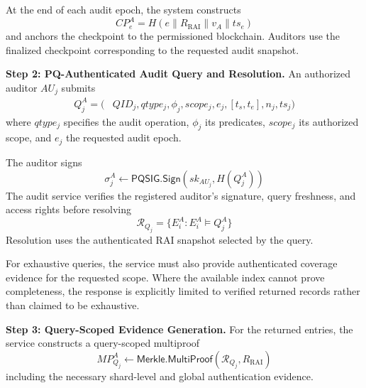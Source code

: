 \documentclass[lettersize,journal]{IEEEtran}
\begin{document}
    At the end of each audit epoch, the system
    constructs
    \begin{equation}
    CP_e^A=
    H(e\parallel R_{\mathrm{RAI}}
    \parallel v_A\parallel ts_e)
    \end{equation}
    and anchors the checkpoint to the
    permissioned blockchain. Auditors use
    the finalized checkpoint corresponding
    to the requested audit snapshot.
    
    \medskip
    \noindent\textbf{Step 2: PQ-Authenticated Audit
    Query and Resolution.}
    An authorized auditor $AU_j$ submits
    \begin{equation}
    \begin{aligned}
    Q_j^A=\big(
    &QID_j,qtype_j,\phi_j,scope_j,e_j,[t_s,t_e],n_j,ts_j\big)
    \end{aligned}
    \end{equation}
    where $qtype_j$ specifies the audit
    operation, $\phi_j$ its predicates,
    $scope_j$ its authorized scope, and
    $e_j$ the requested audit epoch.
    
    The auditor signs
    \begin{equation}
    \sigma_j^A\leftarrow
    \mathsf{PQSIG.Sign}
    (sk_{AU_j},H(Q_j^A))
    \end{equation}
    The audit service verifies the registered
    auditor's signature, query freshness,
    and access rights before resolving
    \begin{equation}
    \mathcal{R}_{Q_j}=
    \{E_i^A:E_i^A\models Q_j^A\}
    \end{equation}
    Resolution uses the authenticated RAI
    snapshot selected by the query.
    
    For exhaustive queries, the service must
    also provide authenticated coverage
    evidence for the requested scope. Where
    the available index cannot prove
    completeness, the response is explicitly
    limited to verified returned records
    rather than claimed to be exhaustive.
    
    \medskip
    \noindent\textbf{Step 3: Query-Scoped Evidence
    Generation.}
    For the returned entries, the service
    constructs a query-scoped multiproof
    \begin{equation}
    MP_{Q_j}^A\leftarrow
    \mathsf{Merkle.MultiProof}
    (\mathcal{R}_{Q_j},R_{\mathrm{RAI}})
    \end{equation}
    including the necessary shard-level
    and global authentication evidence.
    
\end{document}
